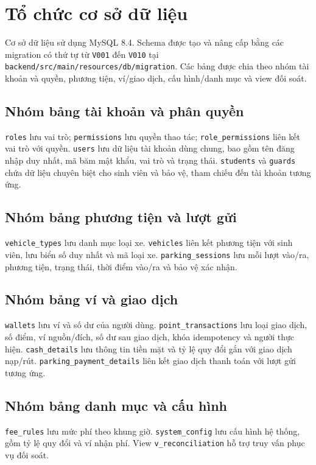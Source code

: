 \section{Tổ chức cơ sở dữ liệu}

Cơ sở dữ liệu sử dụng MySQL 8.4. Schema được tạo và nâng cấp bằng các migration có thứ tự từ \texttt{V001} đến \texttt{V010} tại \texttt{backend/src/main/resources/db/migration}. Các bảng được chia theo nhóm tài khoản và quyền, phương tiện, ví/giao dịch, cấu hình/danh mục và view đối soát.

\subsection{Nhóm bảng tài khoản và phân quyền}
\texttt{roles} lưu vai trò; \texttt{permissions} lưu quyền thao tác; \texttt{role\_permissions} liên kết vai trò với quyền. \texttt{users} lưu dữ liệu tài khoản dùng chung, bao gồm tên đăng nhập duy nhất, mã băm mật khẩu, vai trò và trạng thái. \texttt{students} và \texttt{guards} chứa dữ liệu chuyên biệt cho sinh viên và bảo vệ, tham chiếu đến tài khoản tương ứng.

\subsection{Nhóm bảng phương tiện và lượt gửi}
\texttt{vehicle\_types} lưu danh mục loại xe. \texttt{vehicles} liên kết phương tiện với sinh viên, lưu biển số duy nhất và mã loại xe. \texttt{parking\_sessions} lưu mỗi lượt vào/ra, phương tiện, trạng thái, thời điểm vào/ra và bảo vệ xác nhận.

\subsection{Nhóm bảng ví và giao dịch}
\texttt{wallets} lưu ví và số dư của người dùng. \texttt{point\_transactions} lưu loại giao dịch, số điểm, ví nguồn/đích, số dư sau giao dịch, khóa idempotency và người thực hiện. \texttt{cash\_details} lưu thông tin tiền mặt và tỷ lệ quy đổi gắn với giao dịch nạp/rút. \texttt{parking\_payment\_details} liên kết giao dịch thanh toán với lượt gửi tương ứng.

\subsection{Nhóm bảng danh mục và cấu hình}
\texttt{fee\_rules} lưu mức phí theo khung giờ. \texttt{system\_config} lưu cấu hình hệ thống, gồm tỷ lệ quy đổi và ví nhận phí. View \texttt{v\_reconciliation} hỗ trợ truy vấn phục vụ đối soát.

